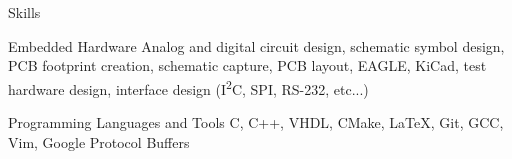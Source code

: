 

\section{\faToolbox}{Skills}

 \resumeEntryStart
  \resumeEntryS
	{Embedded Hardware}
	{
     Analog and digital circuit design, schematic symbol design, PCB footprint
     creation, schematic capture, PCB layout, EAGLE, KiCad, test hardware
     design, interface design (I\textsuperscript{2}C, SPI, RS-232, etc...)
	}

  \resumeEntryS
	{Programming Languages and Tools}
	{
     C, C++, VHDL, CMake, \LaTeX, Git, GCC, Vim, Google Protocol Buffers
	}

  \vspace{5pt}
 \resumeEntryEnd

